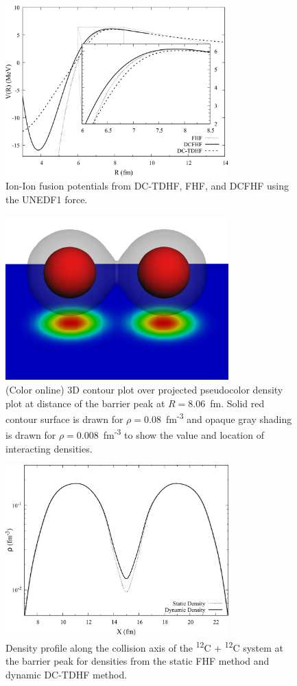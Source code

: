 \begin{figure}
	\includegraphics*[width=8.6cm]{../Figures/PotentialsComp.pdf}
	\caption{Ion-Ion fusion potentials from DC-TDHF, FHF, and DCFHF using the UNEDF1 force.}
	\label{fig:pots}
\end{figure}
\begin{figure}
	\includegraphics*[width=8.6cm]{../Figures/12C12CColl.pdf}
	\caption{(Color online) 3D contour plot over projected pseudocolor density plot at distance of the barrier peak at $R=8.06$~fm. Solid red contour surface is drawn for $\rho = 0.08$~fm\textsuperscript{-3} and opaque gray shading is drawn for $\rho = 0.008$~fm\textsuperscript{-3} to show the value and location of interacting densities.}
	\label{fig:dens}
\end{figure}
\begin{figure}
	\includegraphics*[width=8.6cm]{../Figures/DensityProfile.pdf}
	\caption{Density profile along the collision axis of the \textsuperscript{12}C + \textsuperscript{12}C system at the barrier peak for densities from the static FHF method and dynamic DC-TDHF method. }
	\label{fig:denstrace}
\end{figure}
